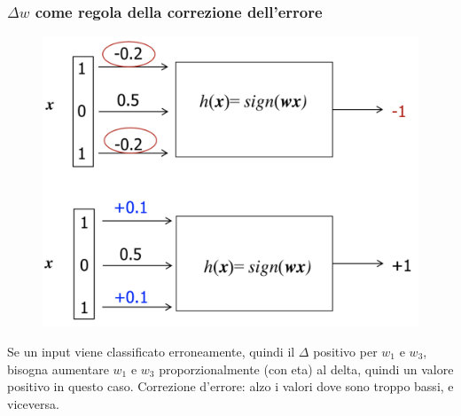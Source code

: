\documentclass{article}
\begin{document}
\subsubsection{$\Delta w$ come regola della correzione dell'errore}
\begin{figure}[H]
\centering
\includegraphics[scale=0.5]{Images/errorcorrection.png}
\end{figure}
Se un input viene classificato erroneamente, quindi il $\Delta$ positivo per $w_1$ e $w_3$, bisogna aumentare $w_1$ e $w_3$ proporzionalmente (con eta) al delta, quindi un valore positivo in questo caso. Correzione d'errore: alzo i valori dove sono troppo bassi, e viceversa.
\end{document}
